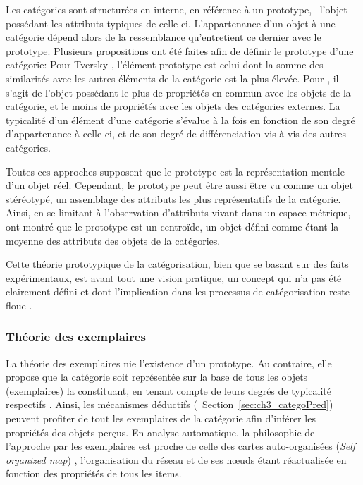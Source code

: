 Les catégories sont structurées en interne, en référence à un prototype, \ie~l'objet possédant les attributs typiques de celle-ci. L'appartenance d'un objet à une catégorie dépend alors de la ressemblance qu'entretient ce dernier avec le prototype.  Plusieurs propositions ont été faites afin de définir le prototype d'une catégorie: Pour Tversky \citep{tversky1977features}, l'élément prototype est celui dont la somme des similarités avec les autres éléments de la catégorie est la plus élevée. Pour \citep{rosch1975family}, il s'agit de l'objet possédant le plus de propriétés en commun avec les objets de la catégorie, et le moins de propriétés avec les objets des catégories externes. La typicalité d'un élément d'une catégorie s'évalue à la fois en fonction de son degré d'appartenance à celle-ci, et de son degré de différenciation vis à vis des autres catégories. 

Toutes ces approches supposent que le prototype est la représentation mentale d'un objet réel. Cependant, le prototype peut être aussi être vu comme un objet stéréotypé, un assemblage des attributs les plus représentatifs de la catégorie. Ainsi, en se limitant à l'observation d'attributs vivant dans un espace métrique, \citep{reed1972pattern, rosch1976structural} ont montré que le prototype est un centroïde, un objet défini comme étant la moyenne des attributs des objets de la catégories. 

Cette théorie prototypique de la catégorisation, bien que se basant sur des faits expérimentaux, est avant tout une vision pratique, un concept qui n'a pas été clairement défini et dont l'implication dans les processus de catégorisation reste floue \citep[p. 36-40]{rosch1978cognition} \citep[p. 49-54]{dubois1991semantique}.

\subsubsection{Théorie des exemplaires}

La théorie des exemplaires nie l'existence d'un prototype. Au contraire, elle propose que la catégorie soit représentée sur la base de tous les objets (exemplaires) la constituant, en tenant compte de leurs degrés de typicalité respectifs \citep{medin1978context,nosofsky1986attention,nosofsky1992similarity}. Ainsi, les mécanismes déductifs (\cf~Section~\ref{sec:ch3_categoPred}) peuvent profiter de tout les exemplaires de la catégorie afin d'inférer les propriétés des objets perçus. En analyse automatique, la philosophie de l'approche par les exemplaires est proche de celle des cartes auto-organisées (\emph{Self organized map}) \citep{kohonen1995som}, l’organisation du réseau et de ses nœuds étant réactualisée en fonction des propriétés de tous les items.

